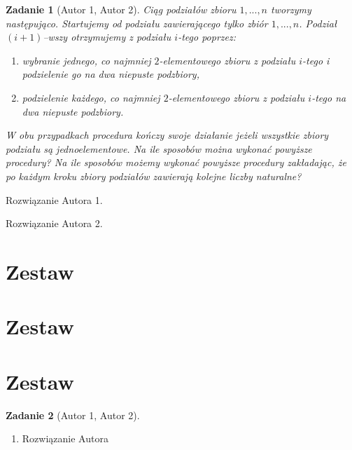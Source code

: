 \documentclass{mwart}
\newtheorem{zad}{Zadanie}[section]
\begin{document}
\begin{zad}[Autor 1, Autor 2]
    Ciąg podziałów zbioru ${1, ..., n}$ tworzymy następująco. Startujemy
    od podziału zawierającego tylko zbiór ${1, ..., n}$. Podział $(i + 1)$--wszy
    otrzymujemy z podziału $i$-tego poprzez:
    \begin{enumerate}
        \item wybranie jednego, co najmniej $2$-elementowego zbioru z podziału $i$-tego i podzielenie
              go na dwa niepuste podzbiory,
        \item podzielenie każdego, co najmniej $2$-elementowego zbioru z podziału $i$-tego na dwa
              niepuste podzbiory.
    \end{enumerate}
    W obu przypadkach procedura kończy swoje działanie jeżeli wszystkie zbiory podziału są
    jednoelementowe. Na ile sposobów można wykonać powyższe procedury? Na ile sposobów
    możemy wykonać powyższe procedury zakładając, że po każdym kroku zbiory podziałów
    zawierają kolejne liczby naturalne?
\end{zad}
\begin{mdframed}
    Rozwiązanie Autora 1.
\end{mdframed}
\begin{mdframed}
    Rozwiązanie Autora 2.
\end{mdframed}

%
\newpage
\section{Zestaw}          %
\section{Zestaw}          %
\section{Zestaw}          %

\begin{zad}[Autor 1, Autor 2]
\end{zad}
\begin{mdframed}
    \begin{enumerate}
        \item Rozwiązanie Autora
    \end{enumerate}
\end{mdframed}
\end{document}
